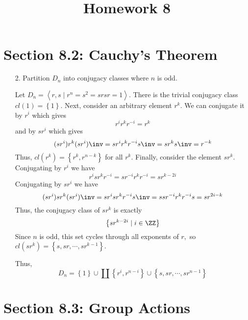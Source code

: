 \documentclass{article}
\begin{document}
\title{Homework 8}
\maketitle
\thispagestyle{fancy}

\section*{Section 8.2: Cauchy's Theorem}

\begin{itemize}
	\item[2.] Partition $D_n$ into conjugacy classes where $n$ is odd.
		\begin{soln}
			Let $D_n=\left< r, s\mid r^n=s^2=srsr=1\right>.$ There is the trivial conjugacy class $cl(1)=\left\{ 1 \right\}.$ Next, consider an arbitrary element $r^k.$ We can conjugate it by $r^i$ which gives \[r^i r^k r^{-i}=r^{k}\] and by $sr^i$ which gives \[(sr^i) r^k (sr^i)\inv = sr^i r^k r^{-i} s\inv = sr^ks\inv= r^{-k}\] Thus, $cl(r^k)=\left\{ r^k, r^{n-k} \right\}$ for all $r^k.$ Finally, consider the element $sr^k.$ Conjugating by $r^i$ we have \[r^i sr^k r^{-i} = sr^{-i}r^kr^{-i}=sr^{k-2i}\] Conjugating by $sr^i$ we have \[(sr^i)sr^k (sr^i)\inv = sr^i sr^k r^{-i} s\inv = ssr^{-i} r^k r^{-i}s = sr^{2i-k}\] Thus, the conjugacy class of $sr^k$ is exactly \[\left\{ sr^{k-2i}\mid i\in \ZZ \right\}\] Since $n$ is odd, this set cycles through all exponents of $r,$ so $cl(sr^k)=\left\{ s, sr, \cdots, sr^{k-1} \right\}.$

			Thus, \[D_n=\left\{ 1 \right\}\cup \coprod \left\{ r^i, r^{n-i} \right\}\cup \left\{ s, sr, \cdots, sr^{n-1} \right\}\]
		\end{soln}
		
\end{itemize}

\section*{Section 8.3: Group Actions}
\end{document}
